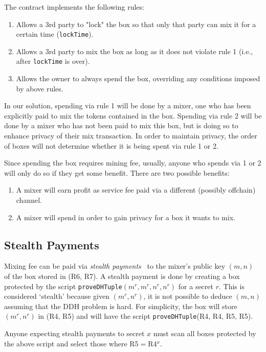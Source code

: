 \documentclass[runningheads]{llncs}
\begin{document}
The contract implements the following rules:
\begin{enumerate}
\item Allows a 3rd party to "lock" the box so that only that party can mix it for a certain time (\texttt{lockTime}).
\item Allows a 3rd party to mix the box as long as it does not violate rule 1 (i.e., after \texttt{lockTime} is over).
\item Allows the owner to always spend the box, overriding any conditions imposed by above rules.

\end{enumerate}

In our solution, spending via rule 1 will be done by a mixer, one who has been explicitly paid to mix the tokens contained in the box.
Spending via rule 2 will be done by a mixer who has not been paid to mix this box, but is doing so to enhance privacy of their mix transaction.
In order to maintain privacy, the order of boxes will not determine whether it is being spent via rule 1 or 2.

Since spending the box requires mining fee, usually, anyone who spends via 1 or 2 will only do so if they get some benefit.
There are two possible benefits:
\begin{enumerate}
\item A mixer will earn profit as service fee paid via a different (possibly offchain) channel.
\item A mixer will spend in order to gain privacy for a box it wants to mix.
\end{enumerate}

\subsection{Stealth Payments}

Mixing fee can be paid via {\em stealth payments}~\cite{stealth-payments} to the mixer's public key $(m, n)$ of the box stored in (R6, R7).
A stealth payment is done by creating a box protected by the script \texttt{proveDHTuple}$(m^r, m^r, n^r, n^r)$ for a secret $r$. This is considered `stealth' because given $(m^r, n^r)$, it is not possible to deduce $(m, n)$ assuming that the DDH problem is hard. For simplicity, the box will store $(m^r, n^r)$ in (R4, R5) and will have the script \texttt{proveDHTuple}(R4, R4, R5, R5).

Anyone expecting stealth payments to secret $x$ must scan all boxes protected by the above script and select those where R5$ = $R4$ ^ x$.
\end{document}
